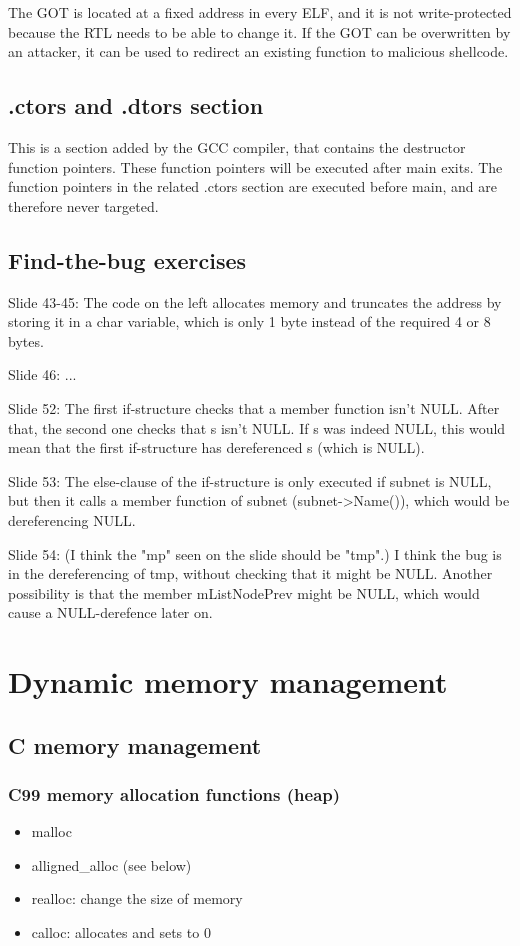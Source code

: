 \documentclass[letterpaper]{article}
\newcommand{\p}{\vspace{1em}\par}		%
\begin{document}
\p The GOT is located at a fixed address in every ELF, and it is not write-protected because the RTL needs to be able to change it. If the GOT can be overwritten by an attacker, it can be used to redirect an existing function to malicious shellcode.

\subsection{.ctors and .dtors section}
This is a section added by the GCC compiler, that contains the destructor function pointers. These function pointers will be executed after main exits. The function pointers in the related .ctors section are executed before main, and are therefore never targeted. 

\subsection{Find-the-bug exercises}
Slide 43-45: The code on the left allocates memory and truncates the address by storing it in a char variable, which is only 1 byte instead of the required 4 or 8 bytes.

\p Slide 46: ...

\p Slide 52: The first if-structure checks that a member function isn't NULL. After that, the second one checks that s isn't NULL. If s was indeed NULL, this would mean that the first if-structure has dereferenced s (which is NULL).

\p Slide 53: The else-clause of the if-structure is only executed if subnet is NULL, but then it calls a member function of subnet (subnet->Name()), which would be dereferencing NULL.

\p Slide 54: (I think the "mp" seen on the slide should be "tmp".) I think the bug is in the dereferencing of tmp, without checking that it might be NULL. Another possibility is that the member mListNodePrev might be NULL, which would cause a NULL-derefence later on.

\section{Dynamic memory management}
\subsection{C memory management}
\subsubsection{C99 memory allocation functions (heap)}
\begin{itemize}
\item malloc
\item alligned\_alloc (see below)
\item realloc: change the size of memory
\item calloc: allocates and sets to 0
\end{itemize}
\end{document}

